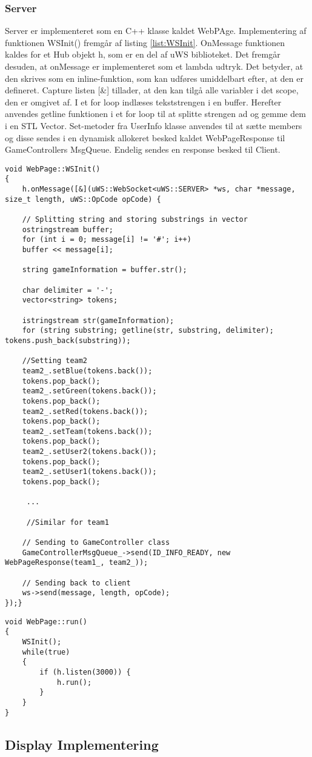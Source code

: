 \documentclass[Softwaredesign/Softwaredesign_main.tex]{subfiles}
\begin{document}
\subsubsection{Server}
Server er implementeret som en C++ klasse kaldet WebPAge. Implementering af funktionen WSInit() fremgår af listing \ref{list:WSInit}. OnMessage funktionen kaldes for et Hub objekt h, som er en del af uWS biblioteket. Det fremgår desuden, at onMessage er implementeret som et lambda udtryk. Det betyder, at den skrives som en inline-funktion, som kan udføres umiddelbart efter, at den er defineret. Capture listen [\&] tillader, at den kan tilgå alle variabler i det scope, den er omgivet af. I et for loop indlæses tekststrengen i en buffer. Herefter anvendes getline funktionen i et for loop til at splitte strengen ad og gemme dem i en STL Vector. Set-metoder fra UserInfo klasse anvendes til at sætte members og disse sendes i en dynamisk allokeret besked kaldet WebPageResponse til GameControllers MsgQueue. Endelig sendes en response besked til Client.
\begin{lstlisting}[caption={Initering af WebSocket}, label=list:WSInit]
void WebPage::WSInit()
{
	h.onMessage([&](uWS::WebSocket<uWS::SERVER> *ws, char *message, size_t length, uWS::OpCode opCode) {

	// Splitting string and storing substrings in vector
	ostringstream buffer;
	for (int i = 0; message[i] != '#'; i++)
	buffer << message[i];

	string gameInformation = buffer.str();

	char delimiter = '-';
	vector<string> tokens;

	istringstream str(gameInformation);
	for (string substring; getline(str, substring, delimiter); tokens.push_back(substring));

	//Setting team2
	team2_.setBlue(tokens.back());
	tokens.pop_back();
	team2_.setGreen(tokens.back());
	tokens.pop_back();
	team2_.setRed(tokens.back());
	tokens.pop_back();
	team2_.setTeam(tokens.back());
	tokens.pop_back();
	team2_.setUser2(tokens.back());
	tokens.pop_back();
	team2_.setUser1(tokens.back());
	tokens.pop_back();

     ...
        
     //Similar for team1
        
	// Sending to GameController class
	GameControllerMsgQueue_->send(ID_INFO_READY, new WebPageResponse(team1_, team2_));

	// Sending back to client
	ws->send(message, length, opCode);
});}
\end{lstlisting}

\begin{lstlisting}[caption={Run() funktion for WebPage}, label=list:webpage_run]
void WebPage::run()
{
	WSInit();
	while(true)
	{
	    if (h.listen(3000)) {
			h.run();
		}
	}
}
\end{lstlisting}

\subsection{Display Implementering}
\label{sec:GUI_implementering_doc}
\end{document}
